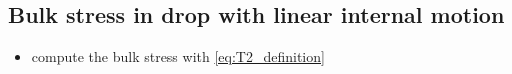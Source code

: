 \subsection{Bulk stress in drop with linear internal motion}

\begin{itemize}
    \item compute the bulk stress with \ref{eq:T2_definition}
\end{itemize}


